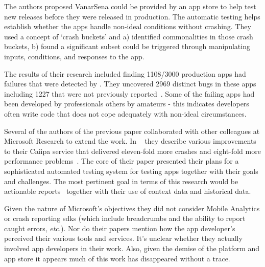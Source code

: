 The authors proposed VanarSena could be provided by an app store to help test new releases before they were released in production. The automatic testing helps establish whether the apps handle non-ideal conditions without crashing. They used a concept of `crash buckets' and a) identified commonalities in those crash buckets, b) found a significant subset could be triggered through manipulating inputs, conditions, and responses to the app.

The results of their research included finding 1108/3000 production  apps had failures that were detected by . They uncovered 2969 distinct bugs in these apps including 1227 that were not previously reported~. Some of the failing apps had been developed by professionals others by amateurs - this indicates developers often write code that does not cope adequately with non-ideal circumstances.  

\afterpage{\clearpage}

Several of the authors of the previous paper collaborated with other colleagues at Microsoft Research to extend the work. In ~\textcite{chandra2015_how_to_smash_the_next_billion_mobile_app_bugs} they describe various improvements to their Caiipa service that delivered eleven-fold more crashes and eight-fold more performance problems~\cite[pp. 37-38]{chandra2015_how_to_smash_the_next_billion_mobile_app_bugs}. The core of their paper presented their plans for a sophisticated automated testing system for testing  apps together with their goals and challenges. The most pertinent goal in terms of this research would be actionable reports~ together with their use of context data and historical data. 

Given the nature of Microsoft's objectives they did not consider Mobile Analytics or crash reporting \Glspl{sdk} 
(which include breadcrumbs and the ability to report caught errors, \emph{etc.}). Nor do their papers mention how the app developer's perceived their various tools and services. It's unclear whether they actually involved app developers in their work. Also, given the demise of the  platform and app store it appears much of this work has disappeared without a trace.


